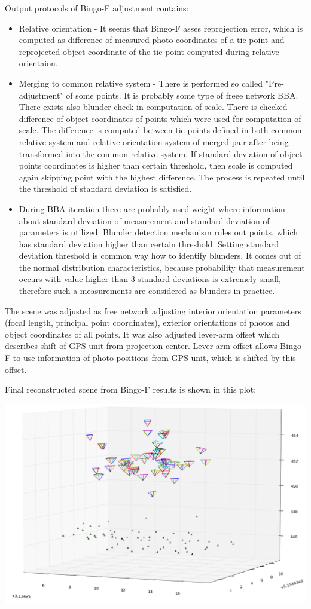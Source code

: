 \documentclass[a4paper,12pt]{article}
\begin{document}
Output  protocols of Bingo-F adjustment contains: 
\begin{itemize}
\item Relative orientation - It seems that Bingo-F asses reprojection error, which is computed 
as difference of measured photo coordinates of a tie point and reprojected object coordinate of the tie point computed during relative orientaion.
\item Merging to common relative system -  There is performed so called "Pre-adjustment" of some points. It is probably some type of freee network 
BBA. There exists also blunder check in computation of scale. There is checked difference of object coordinates of points 
which were used for computation of scale. The difference is computed between tie points defined in both common relative system 
and relative orientation system of merged pair after being transformed into the common relative system.
If standard deviation of object points coordinates is higher than certain threshold, then 
scale is computed again skipping point with the highest difference.
The process is repeated  until  the threshold of standard deviation is satisfied.  
\item During BBA iteration there are probably used weight where information about standard deviation of measurement 
and standard deviation of parameters is utilized. Blunder detection mechanism rules out points, which 
has standard deviation higher than certain threshold. Setting standard deviation threshold  is common way how to identify 
blunders. It comes out of the normal distribution characteristics, because probability that measurement occurs with value 
 higher than 3 standard deviations is extremely small, therefore such a measurements are considered as blunders in practice.
\end{itemize}

The scene was adjusted as free network adjusting interior orientation parameters (focal length, principal point coordinates),
exterior orientations of photos and object coordinates of all points. It was also adjusted lever-arm offset which describes 
shift of GPS unit from projection center.  Lever-arm offset allows Bingo-F to use information of photo positions from GPS unit,
which is shifted by this offset.  

Final reconstructed  scene from Bingo-F results is shown in this plot:

\includegraphics[scale=0.5]{figures/bingo_result.png}
\end{document}
